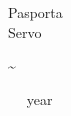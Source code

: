 \begin{titlepage}
    \centering
    \vspace*{10mm}
    {\Geotica
      {\huge
        Pasporta\\ Servo

        \vspace{20mm}
        \textasciitilde
      }

        \vspace{24mm}
        {\small ~~{{ year }}}
    }
\end{titlepage}
